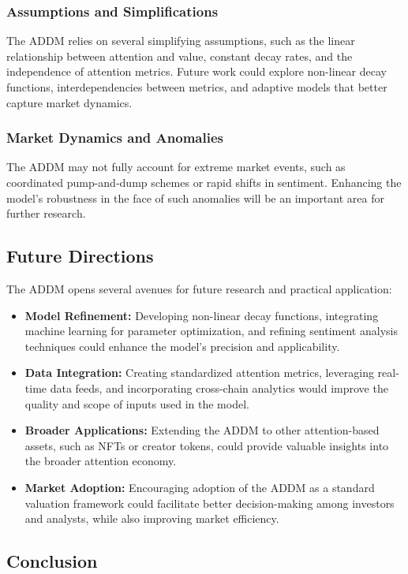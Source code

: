 \documentclass[a4paper,12pt]{article}
\begin{document}
\subsubsection*{Assumptions and Simplifications}
The ADDM relies on several simplifying assumptions, such as the linear relationship between attention and value, constant decay rates, and the independence of attention metrics. Future work could explore non-linear decay functions, interdependencies between metrics, and adaptive models that better capture market dynamics.

\subsubsection*{Market Dynamics and Anomalies}
The ADDM may not fully account for extreme market events, such as coordinated pump-and-dump schemes or rapid shifts in sentiment. Enhancing the model’s robustness in the face of such anomalies will be an important area for further research.

\subsection*{Future Directions}

The ADDM opens several avenues for future research and practical application:

\begin{itemize}
    \item \textbf{Model Refinement:} Developing non-linear decay functions, integrating machine learning for parameter optimization, and refining sentiment analysis techniques could enhance the model’s precision and applicability.
    \item \textbf{Data Integration:} Creating standardized attention metrics, leveraging real-time data feeds, and incorporating cross-chain analytics would improve the quality and scope of inputs used in the model.
    \item \textbf{Broader Applications:} Extending the ADDM to other attention-based assets, such as NFTs or creator tokens, could provide valuable insights into the broader attention economy.
    \item \textbf{Market Adoption:} Encouraging adoption of the ADDM as a standard valuation framework could facilitate better decision-making among investors and analysts, while also improving market efficiency.
\end{itemize}

\subsection*{Conclusion}
\end{document}
